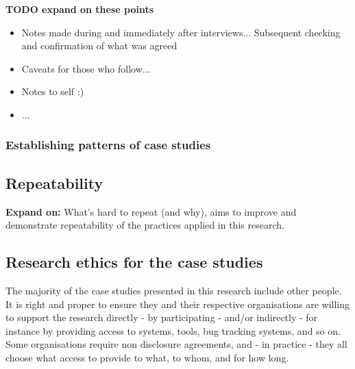 \textbf{TODO expand on these points}
\begin{itemize}
    \item Notes made during and immediately after interviews... Subsequent checking and confirmation of what was agreed
    \item Caveats for those who follow...
    \item Notes to self :)
    \item ...
\end{itemize}

\subsubsection{Establishing patterns of case studies}



\subsection{Repeatability}
\textbf{Expand on:} What's hard to repeat (and why), aims to improve and demonstrate repeatability of the practices applied in this research.

\subsection{Research ethics for the case studies}
\label{section-research-ethics-for-the-case-studies}
The majority of the case studies presented in this research include other people. It is right and proper to ensure they and their respective organisations are willing to support the research directly - by participating - and/or indirectly - for instance by providing access to systems, tools, bug tracking systems, and so on. Some organisations require non disclosure agreements, and - in practice - they all choose what access to provide to what, to whom, and for how long. 

